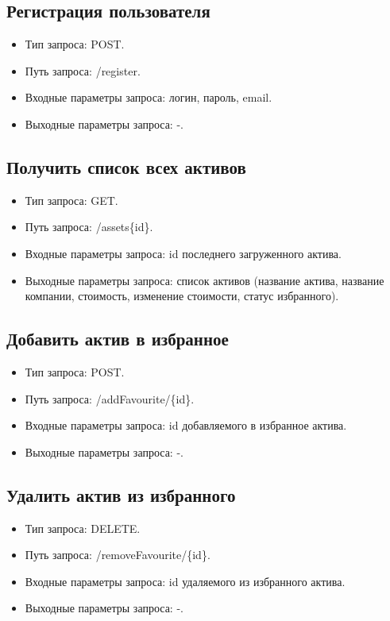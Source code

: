 \documentclass[a4paper, 14pt]{article}
\begin{document}
\subsection{Регистрация пользователя}

\begin{itemize}
    \item Тип запроса: POST.
    \item Путь запроса: /register.
    \item Входные параметры запроса: логин, пароль, email.
    \item Выходные параметры запроса: -.
\end{itemize}

\subsection{Получить список всех активов}

\begin{itemize}
    \item Тип запроса: GET.
    \item Путь запроса: /assets\{id\}.
    \item Входные параметры запроса: id последнего загруженного актива.
    \item Выходные параметры запроса: список активов (название актива, название компании, стоимость, изменение стоимости, статус избранного).
\end{itemize}

\subsection{Добавить актив в избранное}

\begin{itemize}
    \item Тип запроса: POST.
    \item Путь запроса: /addFavourite/\{id\}.
    \item Входные параметры запроса: id добавляемого в избранное актива.
    \item Выходные параметры запроса: -.
\end{itemize}

\subsection{Удалить актив из избранного}

\begin{itemize}
    \item Тип запроса: DELETE.
    \item Путь запроса: /removeFavourite/\{id\}.
    \item Входные параметры запроса: id удаляемого из избранного актива.
    \item Выходные параметры запроса: -.
\end{itemize}
\end{document}
